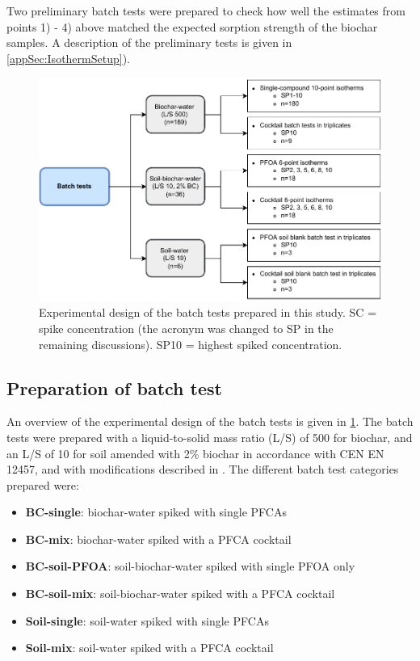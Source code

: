 Two preliminary batch tests were prepared to check how well the estimates from points 1) - 4) above matched the expected sorption strength of the biochar samples. A description of the preliminary tests is given in \cref{appSec:IsothermSetup}).

\begin{figure}[tb]
    \centering
    \includegraphics{Diagrams/Methods-Page-9.pdf}
    \caption{Experimental design of the batch tests prepared in this study. \acrshort{SC} = spike concentration (the acronym was changed to SP in the remaining discussions). SP10 = highest spiked concentration.}
    \label{fig:batchtests_flowchart}
\end{figure}

\subsection{Preparation of batch test \label{sec:batchtests}}
An overview of the experimental design of the batch tests is given in \cref{fig:batchtests_flowchart}. The batch tests were prepared with a liquid-to-solid mass ratio (L/S) of 500 for biochar, and an L/S of 10 for soil amended with 2\% biochar in accordance with CEN EN 12457, and with modifications described in \citep{Hale2017fire, kupryianchyk2016biochar}. The different batch test categories prepared were:

\begin{itemize}
    \item \textbf{BC-single}: biochar-water spiked with single PFCAs
    \item \textbf{BC-mix}: biochar-water spiked with a PFCA cocktail
    \item \textbf{BC-soil-PFOA}: soil-biochar-water spiked with single PFOA only
    \item \textbf{BC-soil-mix}: soil-biochar-water spiked with a PFCA cocktail
    \item \textbf{Soil-single}: soil-water spiked with single PFCAs
    \item \textbf{Soil-mix}: soil-water spiked with a PFCA cocktail
\end{itemize}

